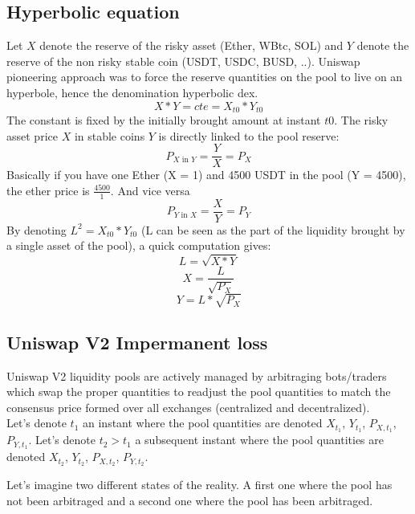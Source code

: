 \documentclass[conference]{IEEEtran}
\begin{document}
\subsection{Hyperbolic equation}
Let $X$ denote the reserve of the risky asset (Ether, WBtc, SOL) and $Y$
denote the reserve of the non risky stable coin (USDT, USDC, BUSD, ..).
Uniswap pioneering approach was to force the reserve quantities on the pool to live on an hyperbole, hence the denomination hyperbolic dex.
\begin{equation}
    X * Y = cte = X_{t0} * Y_{t0}
\end{equation}
The constant is fixed by the initially brought amount at instant $t0$.
The risky asset price $X$ in stable coins $Y$ is directly linked to the pool reserve:
\begin{equation}
    P_{X \text{ in }Y}  = \frac{Y}{X} = P_X
\end{equation}
Basically if you have one Ether (X = 1) and 4500 USDT in the pool (Y = 4500), the ether
price is $\frac{4500}{1}$. And vice versa
\begin{equation}
    P_{Y \text{ in }X}  = \frac{X}{Y} = P_Y
\end{equation}
By denoting $L^2 = X_{t0} * Y_{t0}$ (L can be seen as the part of the liquidity brought by a single asset of the pool), a quick computation gives:
\begin{equation}
    L=\sqrt{X*Y}
\end{equation}
\begin{equation}
    X = \frac{L}{\sqrt{P_X}}  
\end{equation}
\begin{equation}
    Y = L*\sqrt{P_X}
\end{equation}

\subsection{Uniswap V2 Impermanent loss}
Uniswap V2 liquidity pools  are actively managed by arbitraging bots/traders which swap
the proper quantities to readjust the pool quantities to match the consensus price formed over all exchanges (centralized and decentralized).\\
Let's denote $t_1$ an instant where the pool quantities are denoted $X_{t_1}$, $Y_{t_1}$, $P_{X,t_1}$, $P_{Y,t_1}$.
Let's denote $t_2 > t_1$ a subsequent instant where the pool quantities are denoted $X_{t_2}$, $Y_{t_2}$, $P_{X,t_2}$, $P_{Y,t_2}$.

Let's imagine two different states of the reality. A first one where the pool has not been arbitraged and a second one where the pool has been arbitraged.
\end{document}
